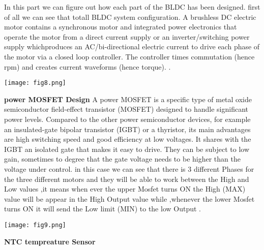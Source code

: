 \documentclass[11pt]{article}
\begin{document}
\label{BLDC Motor Schematic}
 In this part we can figure out how each part of the BLDC has been designed.\newline
first of all we can see that totall BLDC system configuration.\newline
A brushless DC electric motor contains a synchronous motor and integrated power electronics that operate the motor from a direct current supply or an inverter/switching power supply which\newline produces an AC/bi-directional electric current to drive each phase of the motor via a closed loop controller. The controller times commutation (hence rpm) and creates current waveforms (hence torque). .\newline

\begin {center}
\texttt{[image: fig8.png]}\newline
\end{center}
\textbf{power MOSFET Design}
\newline
A power MOSFET is a specific type of metal oxide semiconductor field-effect transistor (MOSFET) designed to handle significant power levels.\newline
Compared to the other power semiconductor devices, for example an insulated-gate bipolar transistor (IGBT) or a thyristor, its main advantages are high switching speed and good efficiency at low voltages. It shares with the IGBT an isolated gate that makes it easy to drive. They can be subject to low gain, sometimes to degree that the gate voltage needs to be higher than the voltage under control.\newline
in this case we can see that there is 3 different Phases for the three different motors and they will be able to work between the High and Low values ,it means when ever the upper Mosfet turns ON the High (MAX) value will be appear in the High Output value while ,whenever the lower Mosfet turns ON it will send the Low limit (MIN) to the  low Output . 
\begin {center}
\texttt{[image: fig9.png]}\newline
\end{center}

\textbf{NTC tempreature Sensor}\newline
\end{document}
